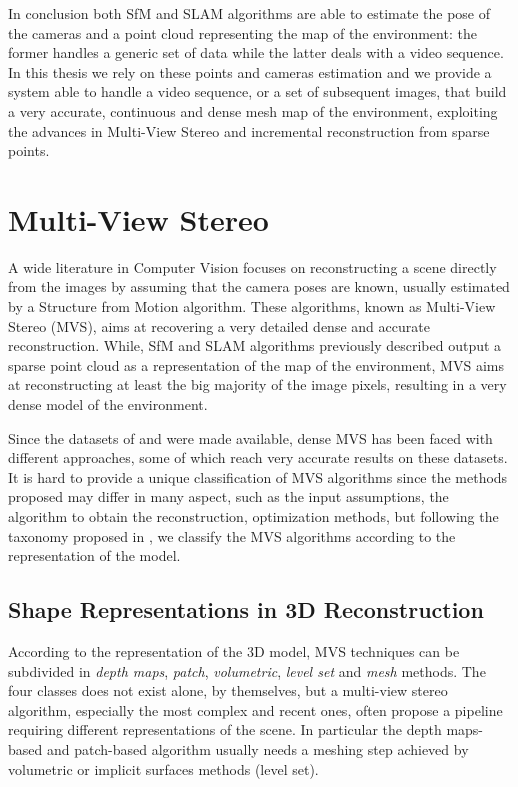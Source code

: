 
In conclusion both SfM and SLAM algorithms are able to estimate the pose of the cameras and a point cloud representing the map of the environment: the former handles a generic set of data while the latter deals with a video sequence. 
In this thesis we rely on these points and cameras estimation and we provide a system able to handle a video sequence, or a set of subsequent images, that build a very accurate, continuous and dense mesh map of the environment, exploiting the advances in Multi-View Stereo and incremental reconstruction from sparse points.

\section{Multi-View Stereo}
A wide literature in Computer Vision focuses on reconstructing a scene directly from the images by assuming that the camera poses are known, usually estimated by a Structure from Motion algorithm.
These algorithms, known as Multi-View Stereo (MVS), aims at recovering a very detailed dense and accurate reconstruction. 
While, SfM and SLAM algorithms previously described output a sparse point cloud as a representation of the map of the environment, MVS aims at reconstructing at least the big majority of the image pixels, resulting in a very dense model of the environment.


Since the datasets of \cite{Seitz_et_al06} and \cite{strecha2008} were made available, dense MVS has been faced with different approaches, some of which reach very accurate results on these datasets.
It is hard to provide a unique classification of MVS algorithms since the methods proposed may differ in many aspect, such as the input assumptions, the algorithm to obtain the reconstruction, optimization methods, but following the taxonomy proposed in \cite{Seitz_et_al06}, we classify the MVS algorithms according to the representation of the model.
\subsection{Shape Representations in 3D Reconstruction}
According to the representation of the 3D model, MVS techniques can be subdivided in \emph{depth maps}, \emph{patch}, \emph{volumetric},  \emph{level set} and \emph{mesh} methods. The four classes does not exist alone, by themselves, but a multi-view stereo algorithm, especially the most complex and recent ones, often propose a pipeline requiring different representations of the scene. In particular the depth maps-based and patch-based algorithm usually needs a meshing step achieved by volumetric or implicit surfaces methods (level set).

